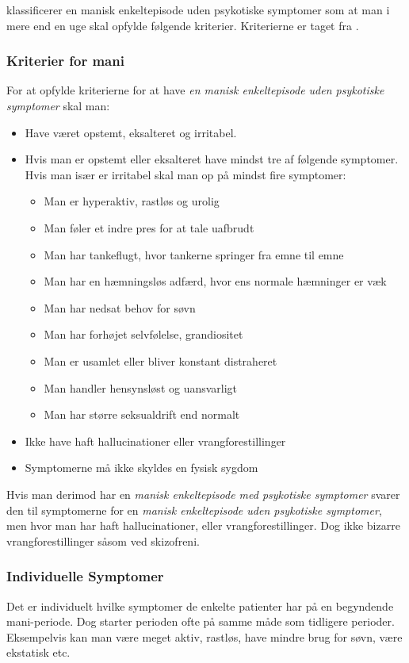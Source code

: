 \citet{misc:netpsykmani} klassificerer en manisk enkeltepisode uden psykotiske symptomer som at man i mere end en uge skal opfylde følgende kriterier.
Kriterierne er taget fra \citet{misc:netpsykmani}.
\begin{mdframed}
\subsubsection{Kriterier for mani}
For at opfylde kriterierne for at have \textit{en manisk enkeltepisode uden psykotiske symptomer} skal man:
\begin{itemize}
	\item Have været opstemt, eksalteret og irritabel.
	\item Hvis man er opstemt eller eksalteret have mindst tre af følgende symptomer. Hvis man især er irritabel skal man op på mindst fire symptomer:
	\begin{itemize}
		\item Man er hyperaktiv, rastløs og urolig
		\item Man føler et indre pres for at tale uafbrudt
		\item Man har tankeflugt, hvor tankerne springer fra emne til emne
		\item Man har en hæmningsløs adfærd, hvor ens normale hæmninger er væk
		\item Man har nedsat behov for søvn
		\item Man har forhøjet selvfølelse, grandiositet
		\item Man er usamlet eller bliver konstant distraheret
		\item Man handler hensynsløst og uansvarligt
		\item Man har større seksualdrift end normalt
	\end{itemize}
	\item Ikke have haft hallucinationer eller vrangforestillinger
	\item Symptomerne må ikke skyldes en fysisk sygdom
\end{itemize}
\end{mdframed}
Hvis man derimod har en \textit{manisk enkeltepisode med psykotiske symptomer} svarer den til symptomerne for en \textit{manisk enkeltepisode uden psykotiske symptomer}, men hvor man har haft hallucinationer, eller vrangforestillinger. Dog ikke bizarre vrangforestillinger såsom ved skizofreni.

\subsubsection{Individuelle Symptomer}
Det er individuelt hvilke symptomer de enkelte patienter har på en begyndende mani-periode.
Dog starter perioden ofte på samme måde som tidligere perioder.
Eksempelvis kan man være meget aktiv, rastløs, have mindre brug for søvn, være ekstatisk etc.

